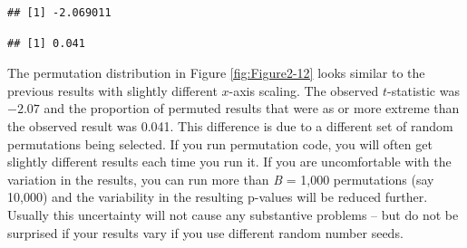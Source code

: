 \documentclass[
]{book}
\newenvironment{Shaded}{\begin{snugshade}}{\end{snugshade}}
\newcommand{\AttributeTok}[1]{\textcolor[rgb]{0.77,0.63,0.00}{#1}}
\newcommand{\ConstantTok}[1]{\textcolor[rgb]{0.00,0.00,0.00}{#1}}
\newcommand{\ControlFlowTok}[1]{\textcolor[rgb]{0.13,0.29,0.53}{\textbf{#1}}}
\newcommand{\DecValTok}[1]{\textcolor[rgb]{0.00,0.00,0.81}{#1}}
\newcommand{\FunctionTok}[1]{\textcolor[rgb]{0.00,0.00,0.00}{#1}}
\newcommand{\NormalTok}[1]{#1}
\newcommand{\OtherTok}[1]{\textcolor[rgb]{0.56,0.35,0.01}{#1}}
\newcommand{\SpecialCharTok}[1]{\textcolor[rgb]{0.00,0.00,0.00}{#1}}
\begin{document}
\begin{Shaded}
\end{Shaded}

\begin{verbatim}
## [1] -2.069011
\end{verbatim}

\begin{Shaded}
\end{Shaded}

\begin{verbatim}
## [1] 0.041
\end{verbatim}

\indent The permutation distribution
in Figure \ref{fig:Figure2-12} looks
similar to the previous results with slightly different \(x\)-axis scaling. The
observed \(t\)-statistic was \(-2.07\) and the proportion of permuted results that
were as or more extreme than the observed result
was 0.041. This difference is due to a different set of random permutations
being selected. If you run permutation code, you will often get slightly
different results each time you run it. If you are uncomfortable with the
variation in the results, you can run more than \emph{B} = 1,000 permutations (say
10,000) and the variability in the resulting p-values will be reduced further.
Usually this uncertainty will not cause any substantive problems -- but do not
be surprised if your results vary if you use different random number seeds.
\end{document}
